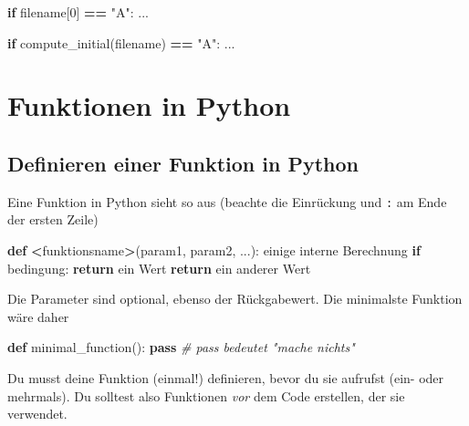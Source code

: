 \documentclass[
]{book}
\newenvironment{Shaded}{\begin{snugshade}}{\end{snugshade}}
\newcommand{\CommentTok}[1]{\textcolor[rgb]{0.56,0.35,0.01}{\textit{#1}}}
\newcommand{\ControlFlowTok}[1]{\textcolor[rgb]{0.13,0.29,0.53}{\textbf{#1}}}
\newcommand{\DecValTok}[1]{\textcolor[rgb]{0.00,0.00,0.81}{#1}}
\newcommand{\KeywordTok}[1]{\textcolor[rgb]{0.13,0.29,0.53}{\textbf{#1}}}
\newcommand{\NormalTok}[1]{#1}
\newcommand{\OperatorTok}[1]{\textcolor[rgb]{0.81,0.36,0.00}{\textbf{#1}}}
\newcommand{\StringTok}[1]{\textcolor[rgb]{0.31,0.60,0.02}{#1}}
\begin{document}
\begin{Shaded}
\begin{Highlighting}[]
\ControlFlowTok{if}\NormalTok{ filename[}\DecValTok{0}\NormalTok{] }\OperatorTok{==} \StringTok{"A"}\NormalTok{:}
\NormalTok{    ...}
    
\ControlFlowTok{if}\NormalTok{ compute\_initial(filename) }\OperatorTok{==} \StringTok{"A"}\NormalTok{:}
\NormalTok{    ...}
\end{Highlighting}
\end{Shaded}

\hypertarget{funktionen-in-python}{%
\section{Funktionen in Python}\label{funktionen-in-python}}

\hypertarget{definieren-einer-funktion-in-python}{%
\subsection{Definieren einer Funktion in Python}\label{definieren-einer-funktion-in-python}}

Eine Funktion in Python sieht so aus (beachte die Einrückung und \texttt{:} am Ende der ersten Zeile)

\begin{Shaded}
\begin{Highlighting}[]
\KeywordTok{def} \OperatorTok{\textless{}}\NormalTok{funktionsname}\OperatorTok{\textgreater{}}\NormalTok{(param1, param2, ...):}
\NormalTok{    einige interne Berechnung}
    \ControlFlowTok{if}\NormalTok{ bedingung:}
        \ControlFlowTok{return}\NormalTok{ ein Wert}
    \ControlFlowTok{return}\NormalTok{ ein anderer Wert}
\end{Highlighting}
\end{Shaded}

Die Parameter sind optional, ebenso der Rückgabewert. Die minimalste Funktion wäre daher

\begin{Shaded}
\begin{Highlighting}[]
\KeywordTok{def}\NormalTok{ minimal\_function():}
    \ControlFlowTok{pass} \CommentTok{\# pass bedeutet "mache nichts"}
\end{Highlighting}
\end{Shaded}

Du musst deine Funktion (einmal!) definieren, bevor du sie aufrufst (ein- oder mehrmals). Du solltest also Funktionen \emph{vor} dem Code erstellen, der sie verwendet.
\end{document}
